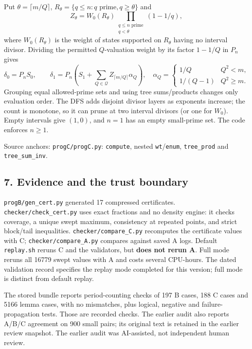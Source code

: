 \documentclass[
  11pt,
]{article}
\begin{document}
Put \(\theta=\lceil m/Q\rceil\),
\(R_\theta=\{q\le n:q\text{ prime},q\ge\theta\}\) and
\[Z_\theta=W_0(R_\theta)\prod_{\substack{q\le n\text{ prime}\\q<\theta}}(1-1/q),\]
where \(W_0(R_\theta)\) is the weight of states supported on
\(R_\theta\) having no interval divisor. Dividing the permitted
\(Q\)-valuation weight by its factor \(1-1/Q\) in \(P_n\) gives
\[\delta_0=P_nS_0,\qquad\delta_1=P_n\left(S_1+\sum_{Q\in\mathcal Q}Z_{\lceil m/Q\rceil}\alpha_Q\right),\quad
\alpha_Q=\begin{cases}1/Q&Q^2<m,\\1/(Q-1)&Q^2\ge m.\end{cases}\]
Grouping equal allowed-prime sets and using tree sums/products changes
only evaluation order. The DFS adds disjoint divisor layers as exponents
increase; the count is monotone, so it can prune at two interval
divisors (or one for \(W_0\)). Empty intervals give \((1,0)\), and
\(n=1\) has an empty small-prime set. The code enforces \(n\ge1\).

Source anchors: \texttt{progC/progC.py}: \texttt{compute}, nested
\texttt{wt}/\texttt{enum}, \texttt{tree\_prod} and
\texttt{tree\_sum\_inv}.

\subsection{7. Evidence and the trust
boundary}\label{evidence-and-the-trust-boundary}

\texttt{progB/gen\_cert.py} generated 17 compressed certificates.
\texttt{checker/check\_cert.py} uses exact fractions and no density
engine: it checks coverage, a unique swept maximum, consistency at
repeated points, and strict block/tail inequalities.
\texttt{checker/compare\_C.py} recomputes the certificate values with C;
\texttt{checker/compare\_A.py} compares against saved A logs. Default
\texttt{replay.sh} reruns C and the validators, but \textbf{does not
rerun A}. Full mode reruns all 16779 swept values with A and costs
several CPU-hours. The dated validation record specifies the replay mode
completed for this version; full mode is distinct from default replay.

The stored bundle reports period-counting checks of 197 B cases, 188 C
cases and 5166 lemma cases, with no mismatches, plus logical, negative
and failure-propagation tests. Those are recorded checks. The earlier
audit also reports A/B/C agreement on 900 small pairs; its original text
is retained in the earlier review snapshot. The earlier audit was
AI-assisted, not independent human review.
\end{document}
